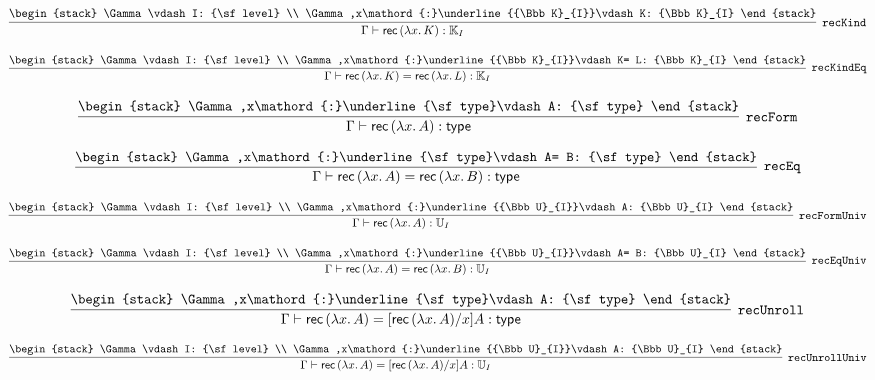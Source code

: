\[
\infer[{\tt recKind}]{\Gamma \vdash {\sf rec}\,(\lambda x.\,K): {\Bbb K}_{I}}{
\begin{stack}
\Gamma \vdash I: {\sf level}
\\
\Gamma ,x\mathord{:}\underline{{\Bbb K}_{I}}\vdash K: {\Bbb K}_{I}
\end{stack}}
\]

\[
\infer[{\tt recKindEq}]{\Gamma \vdash {\sf rec}\,(\lambda x.\,K)= {\sf rec}\,(\lambda x.\,L): {\Bbb K}_{I}}{
\begin{stack}
\Gamma \vdash I: {\sf level}
\\
\Gamma ,x\mathord{:}\underline{{\Bbb K}_{I}}\vdash K= L: {\Bbb K}_{I}
\end{stack}}
\]

\[
\infer[{\tt recForm}]{\Gamma \vdash {\sf rec}\,(\lambda x.\,A): {\sf type}}{
\begin{stack}
\Gamma ,x\mathord{:}\underline{\sf type}\vdash A: {\sf type}
\end{stack}}
\]

\[
\infer[{\tt recEq}]{\Gamma \vdash {\sf rec}\,(\lambda x.\,A)= {\sf rec}\,(\lambda x.\,B): {\sf type}}{
\begin{stack}
\Gamma ,x\mathord{:}\underline{\sf type}\vdash A= B: {\sf type}
\end{stack}}
\]

\[
\infer[{\tt recFormUniv}]{\Gamma \vdash {\sf rec}\,(\lambda x.\,A): {\Bbb U}_{I}}{
\begin{stack}
\Gamma \vdash I: {\sf level}
\\
\Gamma ,x\mathord{:}\underline{{\Bbb U}_{I}}\vdash A: {\Bbb U}_{I}
\end{stack}}
\]

\[
\infer[{\tt recEqUniv}]{\Gamma \vdash {\sf rec}\,(\lambda x.\,A)= {\sf rec}\,(\lambda x.\,B): {\Bbb U}_{I}}{
\begin{stack}
\Gamma \vdash I: {\sf level}
\\
\Gamma ,x\mathord{:}\underline{{\Bbb U}_{I}}\vdash A= B: {\Bbb U}_{I}
\end{stack}}
\]

\[
\infer[{\tt recUnroll}]{\Gamma \vdash {\sf rec}\,(\lambda x.\,A)= [{\sf rec}\,(\lambda x.\,A)/x]A: {\sf type}}{
\begin{stack}
\Gamma ,x\mathord{:}\underline{\sf type}\vdash A: {\sf type}
\end{stack}}
\]

\[
\infer[{\tt recUnrollUniv}]{\Gamma \vdash {\sf rec}\,(\lambda x.\,A)= [{\sf rec}\,(\lambda x.\,A)/x]A: {\Bbb U}_{I}}{
\begin{stack}
\Gamma \vdash I: {\sf level}
\\
\Gamma ,x\mathord{:}\underline{{\Bbb U}_{I}}\vdash A: {\Bbb U}_{I}
\end{stack}}
\]

